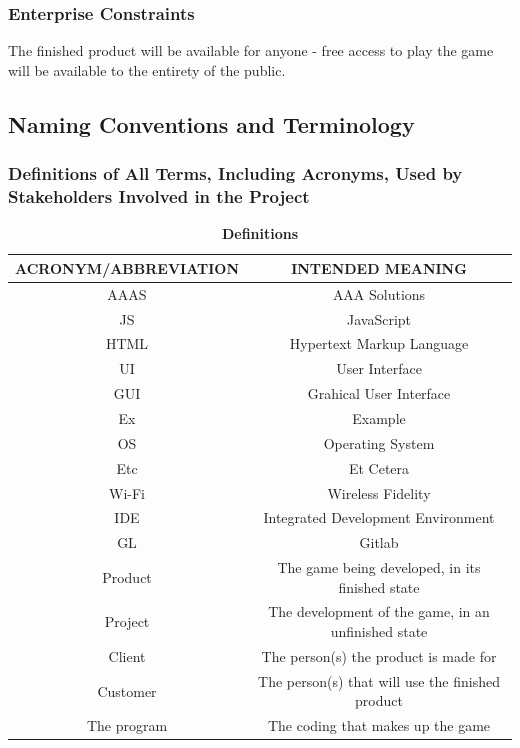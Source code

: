\documentclass[12pt, titlepage]{article}
\begin{document}
\subsubsection{Enterprise Constraints}

The finished product will be available for anyone - free access to play the game will be available to the entirety of the public.

\subsection{Naming Conventions and Terminology}

\subsubsection{Definitions of All Terms, Including Acronyms, Used by Stakeholders Involved in the Project}
\begin{table}[H]
\caption{\bf Definitions}
\begin{center}
\begin{tabular}{|c|c|}
\hline
ACRONYM/ABBREVIATION & INTENDED MEANING\\
\hline
AAAS & AAA Solutions\\
\hline
JS & JavaScript\\
\hline
HTML &Hypertext Markup Language\\
\hline
UI & User Interface\\
\hline
GUI & Grahical User Interface\\
\hline
Ex & Example\\
\hline
OS & Operating System\\
\hline
Etc & Et Cetera\\
\hline
Wi-Fi & Wireless Fidelity\\
\hline
IDE & Integrated Development Environment\\
\hline
GL & Gitlab\\
\hline
Product & The game being developed, in its finished state\\
\hline
Project & The development of the game, in an unfinished state\\
\hline
Client & The person(s) the product is made for\\
\hline
Customer & The person(s) that will use the finished product\\
\hline
The program & The coding that makes up the game\\
\hline
\end{tabular}
\end{center}
\label{default}
\end{table}%
\end{document}
